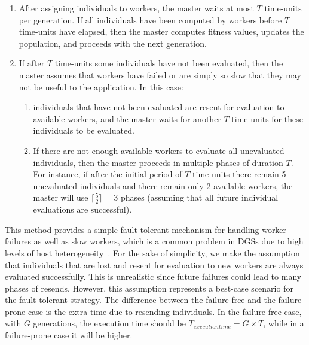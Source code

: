 \documentclass[graybox]{sty/svmult}
\begin{document}
\begin{enumerate}
    \item After assigning individuals to workers, the master waits at most $T$ time-units per 
          generation. If all individuals have been computed by workers before $T$ time-units have elapsed, then the master computes fitness values, updates the
          population, and proceeds with the next generation. 
    \item If after $T$ time-units some individuals have not been evaluated, then the master
          assumes that workers have failed or are simply so slow that they may not
          be useful to the application. In this case: 
          \begin{enumerate}
             \item individuals that have not been evaluated are resent for evaluation 
                   to available workers, and the master waits for another $T$ time-units
                   for these individuals to be evaluated.
             \item If there are not enough available workers to evaluate all unevaluated
                   individuals, then the master proceeds in multiple phases of duration $T$. For
                   instance, if after the initial period of $T$ time-units there remain 5 unevaluated
                   individuals and there remain only 2 available workers, the master will
                   use $\lceil \frac{5}{2} \rceil = 3$ phases (assuming that all future individual
                   evaluations are successful).
        \end{enumerate}
\end{enumerate}

This method provides a simple fault-tolerant mechanism
for handling worker failures as well as slow workers,
which is a common problem in DGSs due to high levels of host
heterogeneity~\cite{boinc-paper,distributed-systems,boinc-power}. For the sake of
simplicity, we make the assumption that individuals that are lost and resent
for evaluation to new workers are always evaluated successfully. This
is unrealistic since future failures could lead to many phases of
resends. However, this assumption represents a best-case scenario for
the fault-tolerant strategy.  The difference between the failure-free and
the failure-prone case is the extra time due to resending individuals.
In the failure-free case, with $G$ generations, the execution time
should be $T_{execution time}=G\times T$, while in a failure-prone case
it will be higher. 
\end{document}
